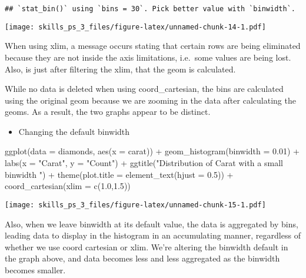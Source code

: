\documentclass[
]{article}
\newenvironment{Shaded}{\begin{snugshade}}{\end{snugshade}}
\newcommand{\AttributeTok}[1]{\textcolor[rgb]{0.77,0.63,0.00}{#1}}
\newcommand{\FloatTok}[1]{\textcolor[rgb]{0.00,0.00,0.81}{#1}}
\newcommand{\FunctionTok}[1]{\textcolor[rgb]{0.00,0.00,0.00}{#1}}
\newcommand{\NormalTok}[1]{#1}
\newcommand{\SpecialCharTok}[1]{\textcolor[rgb]{0.00,0.00,0.00}{#1}}
\newcommand{\StringTok}[1]{\textcolor[rgb]{0.31,0.60,0.02}{#1}}
\providecommand{\tightlist}{%
  \setlength{\itemsep}{0pt}\setlength{\parskip}{0pt}}
\begin{document}
\begin{verbatim}
## `stat_bin()` using `bins = 30`. Pick better value with `binwidth`.
\end{verbatim}

\texttt{[image: skills\_ps\_3\_files/figure-latex/unnamed-chunk-14-1.pdf]}

When using xlim, a message occurs stating that certain rows are being
eliminated because they are not inside the axis limitations, i.e.~some
values are being lost. Also, is just after filtering the xlim, that the
geom is calculated.

While no data is deleted when using coord\_cartesian, the bins are
calculated using the original geom because we are zooming in the data
after calculating the geoms. As a result, the two graphs appear to be
distinct.

\begin{itemize}
\tightlist
\item
  Changing the default binwidth
\end{itemize}

\begin{Shaded}
\begin{Highlighting}[]
\FunctionTok{ggplot}\NormalTok{(}\AttributeTok{data =}\NormalTok{ diamonds, }\FunctionTok{aes}\NormalTok{(}\AttributeTok{x =}\NormalTok{ carat)) }\SpecialCharTok{+} 
  \FunctionTok{geom\_histogram}\NormalTok{(}\AttributeTok{binwidth =} \FloatTok{0.01}\NormalTok{) }\SpecialCharTok{+}
  \FunctionTok{labs}\NormalTok{(}\AttributeTok{x =} \StringTok{"Carat"}\NormalTok{, }\AttributeTok{y =} \StringTok{"Count"}\NormalTok{) }\SpecialCharTok{+}
  \FunctionTok{ggtitle}\NormalTok{(}\StringTok{"Distribution of Carat with a small binwidth "}\NormalTok{) }\SpecialCharTok{+}
  \FunctionTok{theme}\NormalTok{(}\AttributeTok{plot.title =} \FunctionTok{element\_text}\NormalTok{(}\AttributeTok{hjust =} \FloatTok{0.5}\NormalTok{)) }\SpecialCharTok{+} 
  \FunctionTok{coord\_cartesian}\NormalTok{(}\AttributeTok{xlim =} \FunctionTok{c}\NormalTok{(}\FloatTok{1.0}\NormalTok{,}\FloatTok{1.5}\NormalTok{))}
\end{Highlighting}
\end{Shaded}

\texttt{[image: skills\_ps\_3\_files/figure-latex/unnamed-chunk-15-1.pdf]}

Also, when we leave binwidth at its default value, the data is
aggregated by bins, leading data to display in the histogram in an
accumulating manner, regardless of whether we use coord cartesian or
xlim. We're altering the binwidth default in the graph above, and data
becomes less and less aggregated as the binwidth becomes smaller.
\end{document}
